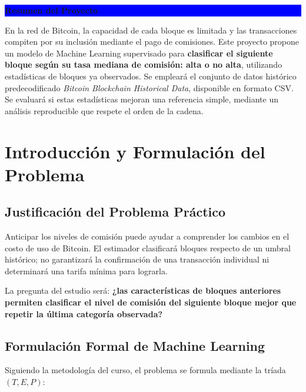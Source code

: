 \documentclass[11pt,a4paper]{article}
\begin{document}
\tableofcontents

\clearpage

{}
{\setlength{\fboxsep}{9pt}
\noindent\colorbox{blue}{\parbox{\dimexpr\linewidth-18pt\relax}{\color{white}\bfseries Resumen del Proyecto}}\par\vspace{-5pt}
\noindent\colorbox{pale}{\parbox{\dimexpr\linewidth-18pt\relax}{
En la red de Bitcoin, la capacidad de cada bloque es limitada y las transacciones compiten por su inclusión mediante el pago de comisiones. Este proyecto propone un modelo de Machine Learning supervisado para \textbf{clasificar el siguiente bloque según su tasa mediana de comisión: alta o no alta}, utilizando estadísticas de bloques ya observados. Se empleará el conjunto de datos histórico predecodificado \textit{Bitcoin Blockchain Historical Data}, disponible en formato CSV. Se evaluará si estas estadísticas mejoran una referencia simple, mediante un análisis reproducible que respete el orden de la cadena.
}}}

\section{Introducción y Formulación del Problema}

\subsection{Justificación del Problema Práctico}

Anticipar los niveles de comisión puede ayudar a comprender los cambios en el costo de uso de Bitcoin. El estimador clasificará bloques respecto de un umbral histórico; no garantizará la confirmación de una transacción individual ni determinará una tarifa mínima para lograrla.

La pregunta del estudio será: \textbf{¿las características de bloques anteriores permiten clasificar el nivel de comisión del siguiente bloque mejor que repetir la última categoría observada?}

\subsection{Formulación Formal de Machine Learning}

Siguiendo la metodología del curso, el problema se formula mediante la tríada $(T,E,P)$:
\end{document}
